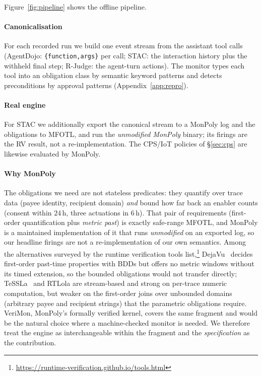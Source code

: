 \documentclass[sigconf]{acmart}
\begin{document}
Figure~\ref{fig:pipeline} shows the offline pipeline.
\paragraph{Canonicalisation} For each recorded run we build one event stream from
the assistant tool calls (AgentDojo: \texttt{\{function,args\}} per call; STAC: the
interaction history plus the withheld final step; R-Judge: the agent-turn actions).
The monitor types each tool into an obligation class by semantic keyword patterns
and detects preconditions by approval patterns (Appendix~\ref{app:repro}).

\paragraph{Real engine} For STAC we additionally export the canonical stream to a
MonPoly log and the obligations to MFOTL, and run the \emph{unmodified MonPoly}
binary; its firings are the RV result, not a re-implementation. The CPS/IoT policies
of \S\ref{sec:cps} are likewise evaluated by MonPoly.

\paragraph{Why MonPoly} The obligations we need are not stateless predicates: they
quantify over trace data (payee identity, recipient domain) \emph{and} bound how far
back an enabler counts (consent within $24$\,h, three actuations in $6$\,h). That pair
of requirements (first-order quantification plus \emph{metric past}) is exactly
safe-range MFOTL, and MonPoly is a maintained implementation of it that runs
\emph{unmodified} on an exported log, so our headline firings are not a
re-implementation of our own semantics. Among the alternatives surveyed by the runtime
verification tools list,\footnote{\url{https://runtime-verification.github.io/tools.html}}
DejaVu~\cite{havelund2018dejavu} decides first-order past-time properties with BDDs but
offers no metric windows without its timed extension, so the bounded obligations would
not transfer directly; TeSSLa~\cite{tessla2018} and RTLola are stream-based and strong
on per-trace numeric computation, but weaker on the first-order joins over unbounded
domains (arbitrary payee and recipient strings) that the parametric obligations
require. VeriMon, MonPoly's formally verified kernel, covers the same
fragment and would be the natural choice where a machine-checked monitor is needed. We
therefore treat the engine as interchangeable within the fragment and the
\emph{specification} as the contribution.
\end{document}
